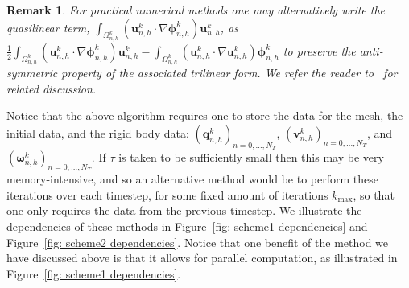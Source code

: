 \documentclass[a4paper]{amsart}
\numberwithin{equation}{section}
\newcommand{\grad}{\nabla}
\theoremstyle{plain}
\newtheorem{remark}[theorem]{Remark}
\newcommand{\mbf}[1]{\mathbf{#1}}
\begin{document}
\begin{remark}
    \label{remark: finite element advection implementation}
    For practical numerical methods one may alternatively write the quasilinear term, $\int_{\Omega_{n,h}^k} (\mbf{u}_{n,h}^k \cdot \grad \boldsymbol{\phi}_{n,h}^k) \mbf{u}_{n,h}^k$, as $\frac{1}{2}\int_{\Omega_{n,h}^k} (\mbf{u}_{n,h}^k \cdot \grad \boldsymbol{\phi}_{n,h}^k) \mbf{u}_{n,h}^k - \int_{\Omega_{n,h}^k} (\mbf{u}_{n,h}^k \cdot \grad \mbf{u}_{n,h}^k)\boldsymbol{\phi}_{n,h}^k$ to preserve the anti-symmetric property of the associated trilinear form.
    We refer the reader to~\cite{John2016FEMforIncompressibleFlow} for related discussion.
\end{remark}

Notice that the above algorithm requires one to store the data for the mesh, the initial data, and the rigid body data: $(\mbf{q}^k_{n,h})_{n=0,\ldots,N_T}$, $(\mbf{v}^k_{n,h})_{n=0,\ldots,N_T}$, and $(\boldsymbol{\omega}^k_{n,h})_{n=0,\ldots,N_T}$.
If $\tau$ is taken to be sufficiently small then this may be very memory-intensive, and so an alternative method would be to perform these iterations over each timestep, for some fixed amount of iterations $k_{\max}$, so that one only requires the data from the previous timestep.
We illustrate the dependencies of these methods in Figure~\ref{fig: scheme1 dependencies} and Figure~\ref{fig: scheme2 dependencies}.
Notice that one benefit of the method we have discussed above is that it allows for parallel computation, as illustrated in Figure~\ref{fig: scheme1 dependencies}.
\end{document}
